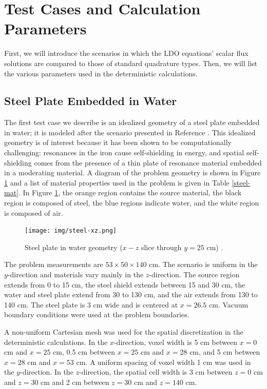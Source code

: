 \documentclass{article} %
\begin{document}
\section{Test Cases and Calculation Parameters}

First, we will introduce the scenarios in which the LDO equations' scalar flux
solutions are compared to those of standard quadrature types. Then, we will list
the various parameters used in the deterministic calculations.

\subsection{Steel Plate Embedded in Water}

The first test case we describe is an idealized geometry of a steel plate 
embedded in water; it is modeled after the scenario presented in Reference 
\cite{wilsonslaybaugh}. This idealized geometry is of interest because it has
been shown to be computationally challenging: resonances in the iron cause
self-shielding in energy, and spatial self-shielding comes from the presence
of a thin plate of resonance material embedded in a moderating material.
A diagram of the problem geometry is shown in Figure \ref{steelxz} and a list
of material properties used in the problem is given in Table \ref{steel-mat}.
In Figure \ref{steelxz}, the orange region contains the source material, the 
black region is composed of steel, the blue regions indicate water, and the 
white region is composed of air.

\begin{figure}[!htb]
\centering
\texttt{[image: img/steel-xz.png]}
\caption{Steel plate in water geometry ($x-z$ slice through $y = 25$ cm) 
         \cite{wilsonslaybaugh}.}
\label{steelxz}
\end{figure}

The problem measurements are $53\times50\times140$ cm. The scenario is uniform 
in the $y$-direction and materials vary mainly in the $z$-direction. The source
region extends from 0 to 15 cm, the steel shield extends between 15 and 30 cm, 
the water and steel plate extend from 30 to 130 cm, and the air extends from 
130 to 140 cm. The steel plate is 3 cm wide and is centered at $x = 26.5$ cm. 
Vacuum boundary conditions were used at the problem boundaries.

A non-uniform Cartesian mesh was used for the spatial discretization in the 
deterministic calculations. In the $x$-direction, voxel width is 5 cm between
$x = 0$ cm and $x = 25$ cm, 0.5 cm between $x = 25$ cm and $x = 28$ cm, and 5 
cm between $x = 28$ cm and $x = 53$ cm. A uniform spacing of voxel width 1 cm 
was used in the $y$-direction. In the $z$-direction, the spatial cell width is
3 cm between $z = 0$ cm and $z = 30$ cm and 2 cm between $z = 30$ cm and 
$z = 140$ cm.
\end{document}
